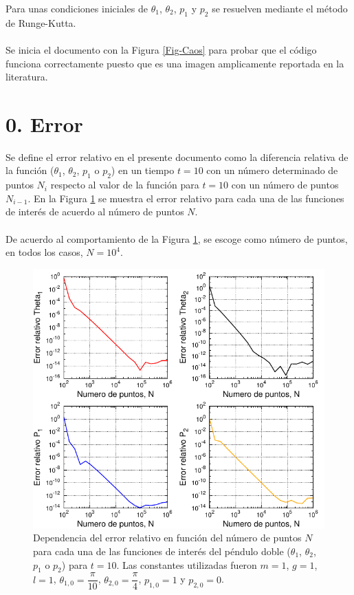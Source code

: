 \documentclass[10pt,letterpaper]{article}
\begin{document}
Para unas condiciones iniciales de $\theta_1$, $\theta_2$, $p_1$ y $p_2$ se resuelven mediante el método de Runge-Kutta. 
\\ \\
Se inicia el documento con la Figura \ref{Fig-Caos} para probar que el código funciona correctamente puesto que es una imagen amplicamente reportada en la literatura. 
\section*{0. Error}
Se define el error relativo en el presente documento como la diferencia relativa de la función ($\theta_1$, $\theta_2$, $p_1$ o $p_2$) en un tiempo $t=10$ con  un número determinado de puntos $N_i$ respecto al valor de la función para $t=10$ con un número de puntos $N_{i-1}$. En la Figura \ref{Fig-ErrorRelativo} se muestra el error relativo para cada una de las funciones de interés de acuerdo al número de puntos $N$. 
\\ \\
De acuerdo al comportamiento de la Figura \ref{Fig-ErrorRelativo}, se escoge como número de puntos, en todos los casos, $N = 10^4$. 
\begin{figure}
\centering 
\includegraphics[scale=1]{Graph_Harmonic_Oscillator.pdf}
\caption{Dependencia del error relativo en función del número de puntos $N$ para cada una de las funciones de interés del péndulo doble ($\theta_1$, $\theta_2$, $p_1$ o $p_2$) para $t=10$. Las constantes utilizadas fueron $m=1$, $g=1$, $l=1$, $\theta_{1,0} = \dfrac{\pi}{10}$, $\theta_{2,0} = \dfrac{\pi}{4}$, $p_{1,0} = 1$ y $p_{2,0} = 0$.}\label{Fig-ErrorRelativo}
\end{figure}
\end{document}
